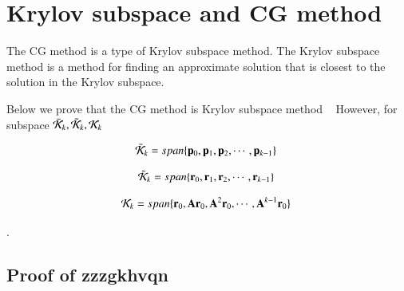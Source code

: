 











\section{Krylov subspace and CG method}

The CG method is a type of Krylov subspace method. The Krylov subspace method is a method for finding an approximate solution that is closest to the solution in the Krylov subspace.


Below we prove that the CG method is Krylov subspace method ~
However, for subspace $\bar{\cal K}_k,\tilde{\cal K}_k,{\cal K}_k$ ~

\begin{equation}
\bar{\cal K}_k=span\{\mathbf{p}_0,\mathbf{p}_1,\mathbf{p}_2,\cdots,\mathbf{p}_{k-1}\}~
\end{equation}


\begin{equation}
\tilde{\cal K}_k=span\{\mathbf{r}_0,\mathbf{r}_1,\mathbf{r}_2,\cdots,\mathbf{r}_{k-1}\}~
\end{equation}


\begin{equation}
{\cal K}_k=span\{\mathbf{r}_0,\mathbf{A}\mathbf{r}_0,\mathbf{A}^2\mathbf{r}_0,\cdots,\mathbf{A}^{k-1}\mathbf{r}_0\}~
\end{equation}

.



\subsection{Proof of zzzgkhvqn}


